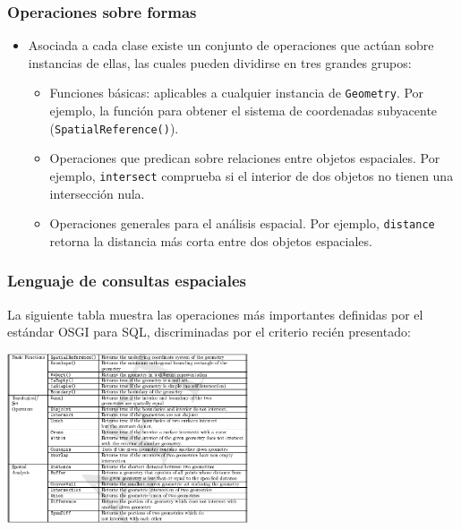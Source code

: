\begin{frame}
\frametitle{Operaciones sobre formas}
\begin{itemize}
	\item	Asociada a cada clase existe un conjunto de operaciones que actúan
		sobre instancias de ellas, las cuales pueden dividirse en tres grandes
		grupos: \pause

		\begin{itemize}
			\item Funciones básicas: aplicables a cualquier instancia de
			\texttt{Geometry}. Por ejemplo, la función para obtener el sistema de
			coordenadas subyacente (\texttt{SpatialReference()}). \pause

			\item Operaciones que predican sobre relaciones entre objetos
			espaciales. Por ejemplo, \texttt{intersect} comprueba si el interior de
			dos objetos no tienen una intersección nula. \pause

			\item Operaciones generales para el análisis espacial. Por ejemplo,
			\texttt{distance} retorna la distancia más corta entre dos objetos
			espaciales.
		\end{itemize}
\end{itemize}
\end{frame}

\begin{frame}
\frametitle{Lenguaje de consultas espaciales}
	La siguiente tabla muestra las operaciones más importantes definidas
	por el estándar OSGI para SQL, discriminadas por el criterio recién
	presentado: \\

	\begin{center}
	\includegraphics[height=5cm]{tablaOGIS.png}
	\end{center}
\end{frame}

